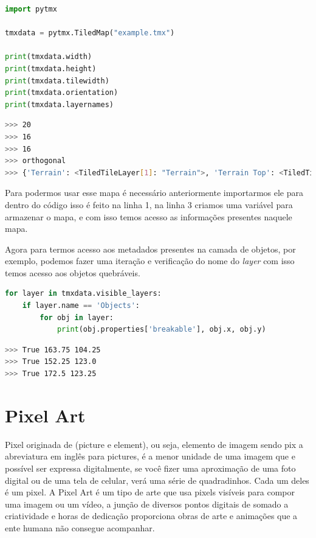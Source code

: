 \begin{lstlisting}[language=python,breaklines, caption= Uso Básico Pytmx]
import pytmx

tmxdata = pytmx.TiledMap("example.tmx")

print(tmxdata.width)
print(tmxdata.height)
print(tmxdata.tilewidth)
print(tmxdata.orientation)
print(tmxdata.layernames)
\end{lstlisting}

\begin{lstlisting}[language=bash,breaklines, caption= Saída]
>>> 20
>>> 16
>>> 16
>>> orthogonal
>>> {'Terrain': <TiledTileLayer[1]: "Terrain">, 'Terrain Top': <TiledTileLayer[2]: "Terrain Top">, 'Objects': <TiledObjectGroup[3]: "Objects">, 'Entities': <TiledObjectGroup[4]: "Entities">}
\end{lstlisting}

Para podermos usar esse mapa é necessário anteriormente importarmos ele para dentro do código isso é feito na linha 1, na linha 3 criamos uma variável para armazenar o mapa, e com isso temos acesso as informações presentes naquele mapa.

Agora para termos acesso aos metadados presentes na camada de objetos, por exemplo, podemos fazer uma iteração e verificação do nome do \textit{layer} com isso temos acesso aos objetos quebráveis.
\begin{lstlisting}[language=python,breaklines, caption= Verificação de Objetos Quebráveis]
for layer in tmxdata.visible_layers:
    if layer.name == 'Objects':
        for obj in layer:
            print(obj.properties['breakable'], obj.x, obj.y)
\end{lstlisting}

\begin{lstlisting}[language=bash,breaklines, caption= Saída]
>>> True 163.75 104.25
>>> True 152.25 123.0
>>> True 172.5 123.25
\end{lstlisting}










\section{Pixel Art}
\label{sec:pixel-art}
Pixel originada de (picture e element), ou seja, elemento de imagem sendo pix a abreviatura em inglês para pictures, é a menor unidade de uma imagem que e possível ser expressa digitalmente, se você fizer uma aproximação de uma foto digital ou de uma tela de celular, verá uma série de quadradinhos. Cada um deles é um pixel. A Pixel Art é um tipo de arte que usa pixels visíveis para compor uma imagem ou um vídeo, a junção de diversos pontos digitais de somado a criatividade e horas de dedicação proporciona obras de arte e animações que a ente humana não consegue acompanhar.

